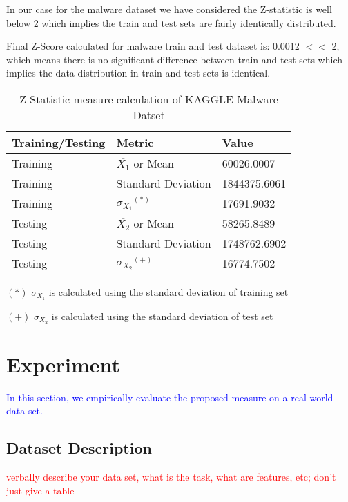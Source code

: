 \documentclass[a4paper,conference]{IEEEtran}
\begin{document}
In our case for the malware dataset we have considered the Z-statistic is well below 2 which implies the train and test sets are fairly identically distributed.

Final Z-Score calculated for malware train and test dataset is: 0.0012 $<<$ 2, which means there is no significant difference between  train and test sets which implies the data distribution in train and test sets is identical.
\begin{table}[t!]
\renewcommand{\arraystretch}{1.3} 
\caption{Z Statistic measure calculation of KAGGLE Malware Datset}
\centering
\begin{threeparttable}
\begin{tabular}{lll} %
\bf Training/Testing & \bf Metric & \bf Value \\ \hline 
Training & $\overline{X_1}$ or Mean & 60026.0007 \\ 
Training & Standard Deviation & 1844375.6061 \\ 
Training & $\sigma_{X_1}$$^{(*)}$ & 17691.9032 \\ 
Testing & $\overline{X_2}$ or Mean & 58265.8489 \\ 
Testing & Standard Deviation & 1748762.6902 \\ 
Testing & $\sigma_{X_2}$$^{(+)}$ & 16774.7502 \\ 
\end{tabular}
\begin{tablenotes}
\item[$(\ast)$]$\sigma_{X_1}$ is calculated using the standard deviation of training set
\item[$(+)$]$\sigma_{X_2}$ is calculated using the standard deviation of test set
\end{tablenotes}
\end{threeparttable}
\end{table}

\section{Experiment}

\textcolor{blue}{In this section, we empirically evaluate the 
proposed measure on a real-world data set.}

\subsection{Dataset Description}

\textcolor{red}{verbally describe your data set, what is the task, 
what are features, etc; don't just give a table}
\end{document}
